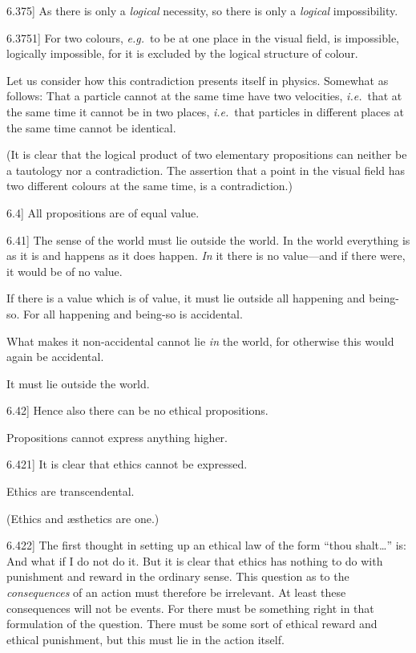 \documentclass[12pt,oneside]{book}[2007/10/19]
\newcommand{\PropositionE}[2]{%
  \item[\phantomsection\label{PropE:#1}\PropGRef{#1}] #2%
}
\newcommand{\PropGRef}[1]{\hyperref[PropG:#1]{#1}}
\newcommand{\idEst}{\textit{i.e.}}
\newcommand{\exempliGratia}{\textit{e.g.}}
\begin{document}
\begin{propositions}
\PropositionE{6.375}
{As there is only a \emph{logical} necessity, so there is
only a \emph{logical} impossibility.}


\PropositionE{6.3751}
{For two colours, \exempliGratia\ to be at one place in the
visual field, is impossible, logically impossible,
for it is excluded by the logical structure of
colour.

Let us consider how this contradiction presents
itself in physics. Somewhat as follows: That a
particle cannot at the same time have two velocities,
\idEst\ that at the same time it cannot be in
two places, \idEst\ that particles in different places
at the same time cannot be identical.

(It is clear that the logical product of two
elementary propositions can neither be a tautology
nor a contradiction. The assertion that a point
in the visual field has two different colours at the
same time, is a contradiction.)}


\PropositionE{6.4}
{All propositions are of equal value.}


\PropositionE{6.41}
{The sense of the world must lie outside the
world. In the world everything is as it is and
happens as it does happen. \emph{In} it there is no value---and
\enlargethispage{11pt} %
if there were, it would be of no value.

If there is a value which is of value, it must
lie outside all happening and being-so. For all
happening and being-so is accidental.

What makes it non-accidental cannot lie \emph{in}
the world, for otherwise this would again be accidental.

It must lie outside the world.}


\PropositionE{6.42}
{Hence also there can be no ethical propositions.

Propositions cannot express anything higher.}


\PropositionE{6.421}
{It is clear that ethics cannot be expressed.

Ethics are transcendental.

(Ethics and æsthetics are one.)}


\PropositionE{6.422}
{The first thought in setting up an ethical law
of the form ``thou shalt\;\ldots'' is: And what
if I do not do it. But it is clear that ethics has
nothing to do with punishment and reward in the
ordinary sense. This question as to the \emph{consequences}
of an action must therefore be irrelevant.
At least these consequences will not be events.
For there must be something right in that formulation
of the question. There must be some sort
of ethical reward and ethical punishment, but this
must lie in the action itself.

}
\end{propositions}
\end{document}
